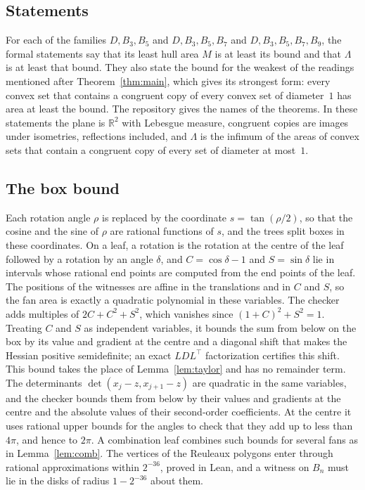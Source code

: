 \documentclass[11pt]{amsart}
\theoremstyle{definition}
\theoremstyle{remark}
\numberwithin{equation}{section}
\newcommand{\R}{\mathbb{R}}
\begin{document}
\subsection{Statements}
For each of the families $D,B_3,B_5$ and $D,B_3,B_5,B_7$ and $D,B_3,B_5,B_7,B_9$, the formal statements say that its least hull area $M$ is at least its bound and that $\Lambda$ is at least that bound. They also state the bound for the weakest of the readings mentioned after Theorem~\ref{thm:main}, which gives its strongest form: every convex set that contains a congruent copy of every convex set of diameter~$1$ has area at least the bound. The repository gives the names of the theorems. In these statements the plane is $\R^2$ with Lebesgue measure, congruent copies are images under isometries, reflections included, and $\Lambda$ is the infimum of the areas of convex sets that contain a congruent copy of every set of diameter at most~$1$.

\subsection{The box bound}
Each rotation angle $\rho$ is replaced by the coordinate $s=\tan(\rho/2)$, so that the cosine and the sine of $\rho$ are rational functions of $s$, and the trees split boxes in these coordinates. On a leaf, a rotation is the rotation at the centre of the leaf followed by a rotation by an angle $\delta$, and $C=\cos\delta-1$ and $S=\sin\delta$ lie in intervals whose rational end points are computed from the end points of the leaf. The positions of the witnesses are affine in the translations and in $C$ and $S$, so the fan area is exactly a quadratic polynomial in these variables. The checker adds multiples of $2C+C^2+S^2$, which vanishes since $(1+C)^2+S^2=1$. Treating $C$ and $S$ as independent variables, it bounds the sum from below on the box by its value and gradient at the centre and a diagonal shift that makes the Hessian positive semidefinite; an exact $LDL^{\top}$ factorization certifies this shift. This bound takes the place of Lemma~\ref{lem:taylor} and has no remainder term. The determinants $\det(x_j-z,x_{j+1}-z)$ are quadratic in the same variables, and the checker bounds them from below by their values and gradients at the centre and the absolute values of their second-order coefficients. At the centre it uses rational upper bounds for the angles to check that they add up to less than $4\pi$, and hence to $2\pi$. A combination leaf combines such bounds for several fans as in Lemma~\ref{lem:comb}. The vertices of the Reuleaux polygons enter through rational approximations within $2^{-36}$, proved in Lean, and a witness on $B_n$ must lie in the disks of radius $1-2^{-36}$ about them.
\end{document}
